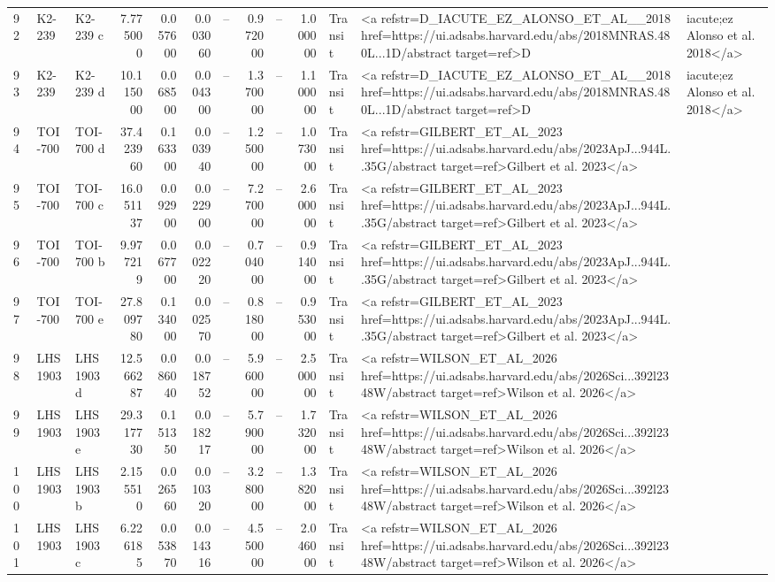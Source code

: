 \begin{tabular}{lllrrrrrrrll}
92 & K2-239 & K2-239 c & 7.775000 & 0.057600 & 0.003060 & -- & 0.972000 & -- & 1.000000 & Transit & <a refstr=D_IACUTE_EZ_ALONSO_ET_AL__2018 href=https://ui.adsabs.harvard.edu/abs/2018MNRAS.480L...1D/abstract target=ref>D&iacute;ez Alonso et al. 2018</a> \\
93 & K2-239 & K2-239 d & 10.115000 & 0.068500 & 0.004300 & -- & 1.370000 & -- & 1.100000 & Transit & <a refstr=D_IACUTE_EZ_ALONSO_ET_AL__2018 href=https://ui.adsabs.harvard.edu/abs/2018MNRAS.480L...1D/abstract target=ref>D&iacute;ez Alonso et al. 2018</a> \\
94 & TOI-700 & TOI-700 d & 37.423960 & 0.163300 & 0.003940 & -- & 1.250000 & -- & 1.073000 & Transit & <a refstr=GILBERT_ET_AL_2023 href=https://ui.adsabs.harvard.edu/abs/2023ApJ...944L..35G/abstract target=ref>Gilbert et al. 2023</a> \\
95 & TOI-700 & TOI-700 c & 16.051137 & 0.092900 & 0.022900 & -- & 7.270000 & -- & 2.600000 & Transit & <a refstr=GILBERT_ET_AL_2023 href=https://ui.adsabs.harvard.edu/abs/2023ApJ...944L..35G/abstract target=ref>Gilbert et al. 2023</a> \\
96 & TOI-700 & TOI-700 b & 9.977219 & 0.067700 & 0.002220 & -- & 0.704000 & -- & 0.914000 & Transit & <a refstr=GILBERT_ET_AL_2023 href=https://ui.adsabs.harvard.edu/abs/2023ApJ...944L..35G/abstract target=ref>Gilbert et al. 2023</a> \\
97 & TOI-700 & TOI-700 e & 27.809780 & 0.134000 & 0.002570 & -- & 0.818000 & -- & 0.953000 & Transit & <a refstr=GILBERT_ET_AL_2023 href=https://ui.adsabs.harvard.edu/abs/2023ApJ...944L..35G/abstract target=ref>Gilbert et al. 2023</a> \\
98 & LHS 1903 & LHS 1903 d & 12.566287 & 0.086040 & 0.018752 & -- & 5.960000 & -- & 2.500000 & Transit & <a refstr=WILSON_ET_AL_2026 href=https://ui.adsabs.harvard.edu/abs/2026Sci...392l2348W/abstract target=ref>Wilson et al. 2026</a> \\
99 & LHS 1903 & LHS 1903 e & 29.317730 & 0.151350 & 0.018217 & -- & 5.790000 & -- & 1.732000 & Transit & <a refstr=WILSON_ET_AL_2026 href=https://ui.adsabs.harvard.edu/abs/2026Sci...392l2348W/abstract target=ref>Wilson et al. 2026</a> \\
100 & LHS 1903 & LHS 1903 b & 2.155510 & 0.026560 & 0.010320 & -- & 3.280000 & -- & 1.382000 & Transit & <a refstr=WILSON_ET_AL_2026 href=https://ui.adsabs.harvard.edu/abs/2026Sci...392l2348W/abstract target=ref>Wilson et al. 2026</a> \\
101 & LHS 1903 & LHS 1903 c & 6.226185 & 0.053870 & 0.014316 & -- & 4.550000 & -- & 2.046000 & Transit & <a refstr=WILSON_ET_AL_2026 href=https://ui.adsabs.harvard.edu/abs/2026Sci...392l2348W/abstract target=ref>Wilson et al. 2026</a> \\

\end{tabular}
